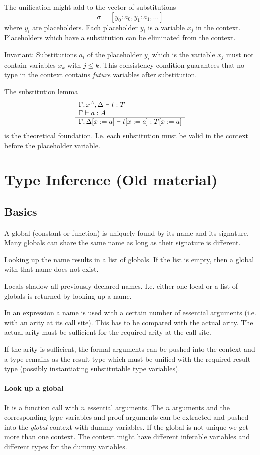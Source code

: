 The unification might add to the vector of substitutions
$$
\sigma = [y_0 : a_0, y_1 : a_1, \ldots]
$$
where $y_i$ are placeholders. Each placeholder $y_i$ is a variable $x_j$ in
the context. Placeholders which have a substitution can be eliminated from the
context.

Invariant: Substitutions $a_i$ of the placeholder $y_i$ which is the variable
$x_j$ must not contain variables $x_k$ with $j \le k$. This consistency
condition guarantees that no type in the context contains \emph{future}
variables after substitution.


The substitution lemma
$$
\begin{array}{l} 
  \Gamma,x^A,\Delta \vdash t : T
  \\
  \Gamma \vdash a: A
 \\ \hline \Gamma, \Delta[x:=a] \vdash t[x:=a] : T[x:=a]\end{array}
$$
is the theoretical foundation. I.e. each substitution must be valid in the
context before the placeholder variable.





\newpage
\section{Type Inference (Old material)}

\subsection{Basics}

A global (constant or function) is uniquely found by its name and its
signature. Many globals can share the same name as long as their signature is
different.

Looking up the name results in a list of globals. If the list is empty, then a
global with that name does not exist.

Locals shadow all previously declared names. I.e. either one local or a list
of globals is returned by looking up a name.

In an expression a name is used with a certain number of essential arguments
(i.e. with an arity at its call site). This has to be compared with the actual
arity. The actual arity must be sufficient for the required arity at the call
site.

If the arity is sufficient, the formal arguments can be pushed into the
context and a type remains as the result type which must be unified with the
required result type (possibly instantiating substitutable type variables).


\paragraph{Look up a global} It is a function call with $n$ essential
arguments. The $n$ arguments and the corresponding type variables and proof
arguments can be extracted and pushed into the \emph{global} context with
dummy variables. If the global is not unique we get more than one context. The
context might have different inferable variables and different types for the
dummy variables.

